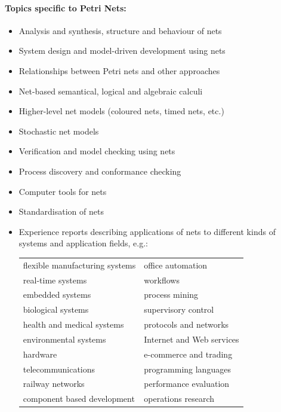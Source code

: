 \documentclass[10pt,a4paper]{article}
\begin{document}
\begin{multicols}{2}
\paragraph*{Topics specific to Petri Nets:}\mbox{}

\begin{itemize}
\item Analysis and synthesis, structure and behaviour of nets
\item System design and model-driven development using nets
\item Relationships between Petri nets and other approaches
\item Net-based semantical, logical and algebraic calculi
\item Higher-level net models (coloured nets, timed nets, etc.)
\item Stochastic net models
\item Verification and model checking using nets
\item Process discovery and conformance checking
\item Computer tools for nets
\item Standardisation of nets
\item Experience reports describing applications of nets to different kinds of systems
and application fields, e.g.:

	\begin{tabular}{ll}
	flexible manufacturing systems & office automation \\
	real-time systems & workflows \\
	embedded systems & process mining \\
	biological systems & supervisory control \\
	health and medical systems & protocols and networks \\
	environmental systems & Internet and Web services \\
	hardware & e-commerce and trading \\
	telecommunications & programming languages \\
	railway networks & performance evaluation \\
	component based development & operations research \\
	\end{tabular}
\end{itemize}
\end{multicols}
\end{document}
